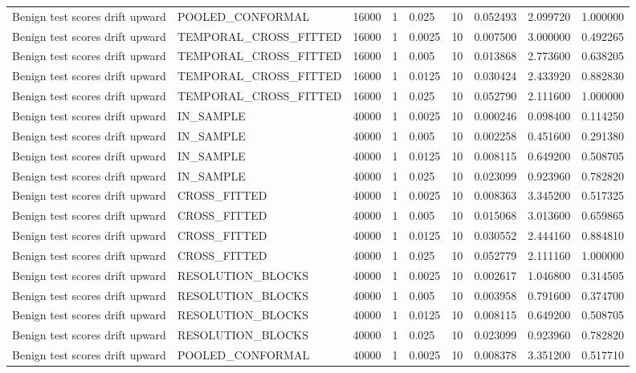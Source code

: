 \begin{tabular}{lllllllll}
Benign test scores drift upward & POOLED\_CONFORMAL & 16000 & 1 & 0.025 & 10 & 0.052493 & 2.099720 & 1.000000 \\
Benign test scores drift upward & TEMPORAL\_CROSS\_FITTED & 16000 & 1 & 0.0025 & 10 & 0.007500 & 3.000000 & 0.492265 \\
Benign test scores drift upward & TEMPORAL\_CROSS\_FITTED & 16000 & 1 & 0.005 & 10 & 0.013868 & 2.773600 & 0.638205 \\
Benign test scores drift upward & TEMPORAL\_CROSS\_FITTED & 16000 & 1 & 0.0125 & 10 & 0.030424 & 2.433920 & 0.882830 \\
Benign test scores drift upward & TEMPORAL\_CROSS\_FITTED & 16000 & 1 & 0.025 & 10 & 0.052790 & 2.111600 & 1.000000 \\
Benign test scores drift upward & IN\_SAMPLE & 40000 & 1 & 0.0025 & 10 & 0.000246 & 0.098400 & 0.114250 \\
Benign test scores drift upward & IN\_SAMPLE & 40000 & 1 & 0.005 & 10 & 0.002258 & 0.451600 & 0.291380 \\
Benign test scores drift upward & IN\_SAMPLE & 40000 & 1 & 0.0125 & 10 & 0.008115 & 0.649200 & 0.508705 \\
Benign test scores drift upward & IN\_SAMPLE & 40000 & 1 & 0.025 & 10 & 0.023099 & 0.923960 & 0.782820 \\
Benign test scores drift upward & CROSS\_FITTED & 40000 & 1 & 0.0025 & 10 & 0.008363 & 3.345200 & 0.517325 \\
Benign test scores drift upward & CROSS\_FITTED & 40000 & 1 & 0.005 & 10 & 0.015068 & 3.013600 & 0.659865 \\
Benign test scores drift upward & CROSS\_FITTED & 40000 & 1 & 0.0125 & 10 & 0.030552 & 2.444160 & 0.884810 \\
Benign test scores drift upward & CROSS\_FITTED & 40000 & 1 & 0.025 & 10 & 0.052779 & 2.111160 & 1.000000 \\
Benign test scores drift upward & RESOLUTION\_BLOCKS & 40000 & 1 & 0.0025 & 10 & 0.002617 & 1.046800 & 0.314505 \\
Benign test scores drift upward & RESOLUTION\_BLOCKS & 40000 & 1 & 0.005 & 10 & 0.003958 & 0.791600 & 0.374700 \\
Benign test scores drift upward & RESOLUTION\_BLOCKS & 40000 & 1 & 0.0125 & 10 & 0.008115 & 0.649200 & 0.508705 \\
Benign test scores drift upward & RESOLUTION\_BLOCKS & 40000 & 1 & 0.025 & 10 & 0.023099 & 0.923960 & 0.782820 \\
Benign test scores drift upward & POOLED\_CONFORMAL & 40000 & 1 & 0.0025 & 10 & 0.008378 & 3.351200 & 0.517710 \\

\end{tabular}
